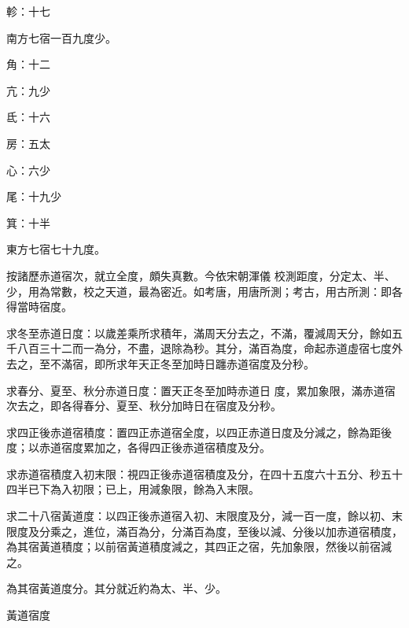 \begin{pinyinscope}
 軫：十七



 南方七宿一百九度少。



 角：十二



 亢：九少



 氐：十六



 房：五太



 心：六少



 尾：十九少



 箕：十半



 東方七宿七十九度。



 按諸歷赤道宿次，就立全度，頗失真數。今依宋朝渾儀
 校測距度，分定太、半、少，用為常數，校之天道，最為密近。如考唐，用唐所測；考古，用古所測：即各得當時宿度。



 求冬至赤道日度：以歲差乘所求積年，滿周天分去之，不滿，覆減周天分，餘如五千八百三十二而一為分，不盡，退除為秒。其分，滿百為度，命起赤道虛宿七度外去之，至不滿宿，即所求年天正冬至加時日躔赤道宿度及分秒。



 求春分、夏至、秋分赤道日度：置天正冬至加時赤道日
 度，累加象限，滿赤道宿次去之，即各得春分、夏至、秋分加時日在宿度及分秒。



 求四正後赤道宿積度：置四正赤道宿全度，以四正赤道日度及分減之，餘為距後度；以赤道宿度累加之，各得四正後赤道宿積度及分。



 求赤道宿積度入初末限：視四正後赤道宿積度及分，在四十五度六十五分、秒五十四半已下為入初限；已上，用減象限，餘為入末限。



 求二十八宿黃道度：以四正後赤道宿入初、末限度及分，減一百一度，餘以初、末限度及分乘之，進位，滿百為分，分滿百為度，至後以減、分後以加赤道宿積度，為其宿黃道積度；以前宿黃道積度減之，其四正之宿，先加象限，然後以前宿減之。



 為其宿黃道度分。其分就近約為太、半、少。



 黃道宿度




\end{pinyinscope}
